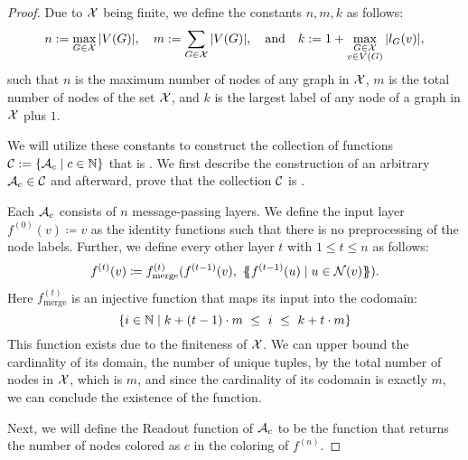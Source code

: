 \begin{proof}
    Due to $\mathcal{X}$ being finite, we define the constants $n, m, k$ as follows:
    \begin{equation*}
        n := \max_{G \in \mathcal{X}} |V(G)|, \quad  m := \sum_{G \in \mathcal{X}} |V(G)|, \quad\text{and}\quad k := 1 + \max_{\substack{G \in \mathcal{X} \\ v \in V(G)}} |l_G(v)|,
    \end{equation*}
    such that $n$ is the maximum number of nodes of any graph in $\mathcal{X}$, $m$ is the total number of nodes of the set $\mathcal{X}$, and $k$ is the largest label of any node of a graph in $\mathcal{X}$ plus $1$.

    We will utilize these constants to construct the collection of functions $\mathcal{C} := \{ \mathcal{A}_c \mid c \in \mathbb{N} \}$ that is \wldisc. We first describe the construction of an arbitrary $\mathcal{A}_c \in \mathcal{C}$ and afterward, prove that the collection $\mathcal{C}$ is \wldisc.

    Each $\mathcal{A}_c$ consists of $n$ message-passing layers. We define the input layer $f^{(0)}(v) \coloneqq v$ as the identity functions such that there is no preprocessing of the node labels. Further, we define every other layer $t$ with $1 \leq t \leq n$ as follows:
    \begin{align*}
        f^{(t)}(v) \coloneqq f^{(t)}_{\text{merge}}(f^{(t-1)}(v), \ \MSopen f^{(t-1)}(u) \mid u \in \cN(v)\MSclose).
    \end{align*}
    Here $f^{(t)}_{\text{merge}}$ is an injective function that maps its input into the codomain:
    \begin{equation*}
       \{ i \in \Nb \mid k + (t-1) \cdot m \ \leq \  i \ \leq \ k + t \cdot m \}
    \end{equation*}
    This function exists due to the finiteness of $\mathcal{X}$. We can upper bound the cardinality of its domain, the number of unique tuples, by the total number of nodes in $\mathcal{X}$, which is $m$, and since the cardinality of its codomain is exactly $m$, we can conclude the existence of the function.

    Next, we will define the \textsf{Readout} function of $\mathcal{A}_c$ to be the function that returns the number of nodes colored as $c$ in the coloring of $f^{(n)}$.
    

\end{proof}

